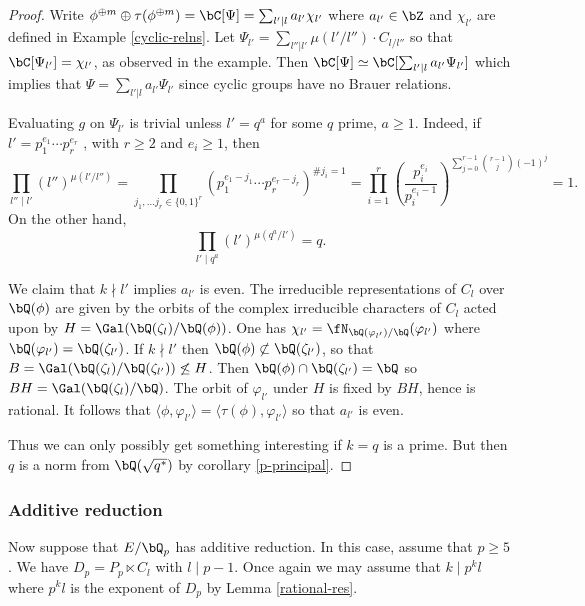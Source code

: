 \begin{proof}
    Write $\phi^{\oplus m} \oplus \tau(\phi^{\oplus m}) = \bC[\Psi] = \sum_{l' \mid l}{a_{l'}} \chi_{l'}$ where $a_{l'} \in \bZ$ and $\chi_{l'}$ are defined in Example \ref{cyclic-relns}. Let $\Psi_{l'} = \sum_{l'' | l'}\mu(l' / l'')\cdot C_{l / l''}$ so that $\bC[\Psi_{l'}] = \chi_{l'}$, as observed in the example. Then $\bC[\Psi] \simeq \bC[\sum_{l' | l } a_{l'} \Psi_{l'}]$ which implies that $\Psi = \sum_{l' | l } a_{l'} \Psi_{l'}$ since cyclic groups have no Brauer relations.

    Evaluating $g$ on $\Psi_{l'}$ is trivial unless $l' = q^a$ for some $q$ prime, $a \geq 1$. Indeed, if $l' = p_1^{e_1} \cdots p_r^{e_r}$ , with $r \geq 2$ and $e_i \geq 1$, then
    \[ \prod_{l'' \mid l'} (l'')^{\mu(l' / l'')} = \prod_{j_1, \ldots j_r \in \{0,1\}^r } \left(p_1^{e_1 - j_1} \cdots p_r^{e_r - j_r}\right)^{\# j_i = 1} = \prod_{i = 1}^r \left(\frac{p_i^{e_i}}{p_i^{e_i - 1}}\right)^{\sum_{ j = 0}^{r - 1} \binom{r-1}{j} (-1)^j} = 1. \]
    On the other hand,
    \[ \prod_{l' \mid q^a} (l')^{\mu(q^a / l')} = q .\]
    
    We claim that $k \nmid l'$ implies $a_{l'}$ is even. The irreducible representations of $C_l$ over $\bQ(\phi)$ are given by the orbits of the complex irreducible characters of $C_l$ acted upon by $H = \Gal (\bQ(\zeta_l) / \bQ(\phi))$. One has $\chi_{l'} = \repnorm{\varphi_{l'}}$ where $\bQ(\varphi_{l'}) = \bQ(\zeta_{l'})$. If $ k \nmid l'$ then $\bQ(\phi) \not\subset \bQ(\zeta_{l'})$, so that $B = \Gal(\bQ(\zeta_l) / \bQ(\zeta_{l'})) \not\leq H$. Then $\bQ(\phi) \cap \bQ(\zeta_{l'}) = \bQ$ so $BH = \Gal(\bQ(\zeta_l) / \bQ)$. The orbit of $\varphi_{l'}$ under $H$ is fixed by $BH$, hence is rational. It follows that $\langle \phi, \varphi_{l'} \rangle = \langle \tau(\phi) , \varphi_{l'} \rangle$ so that $a_{l'}$ is even.  

    Thus we can only possibly get something interesting if $k = q$ is a prime. But then $q$ is a norm from $\bQ(\sqrt{q^*})$ by corollary \ref{p-principal}. 
\end{proof}

\subsubsection*{Additive reduction}

Now suppose that $E / \bQ_p$ has additive reduction. In this case, assume that $p \geq 5$. We have $D_p = P_p \ltimes C_l$ with $ l \mid p - 1$.  
Once again we may assume that $k \mid p^k l$ where $p^k l $ is the exponent of $D_p$ by Lemma \ref{rational-res}.

